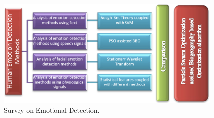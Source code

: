 \begin{figure}[h]
\centering
\includegraphics[width=1\textwidth]{images/Emotion-detection-survey.png}
\caption{Survey on Emotional Detection. \cite{EGGER201935}}\label{fig:survey}
\end{figure}





